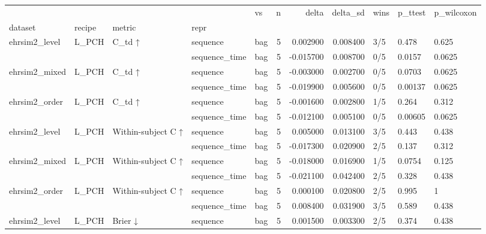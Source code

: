 \begin{tabular}{lllllrrrlll}
\toprule
 &  &  &  & vs & n & delta & delta\_sd & wins & p\_ttest & p\_wilcoxon \\
dataset & recipe & metric & repr &  &  &  &  &  &  &  \\
\midrule
\multirow[t]{2}{*}{ehrsim2\_level} & \multirow[t]{2}{*}{L\_PCH} & \multirow[t]{2}{*}{C\_td ↑} & sequence & bag & 5 & 0.002900 & 0.008400 & 3/5 & 0.478 & 0.625 \\
 &  &  & sequence\_time & bag & 5 & -0.015700 & 0.008700 & 0/5 & 0.0157 & 0.0625 \\
\cline{1-11} \cline{2-11} \cline{3-11}
\multirow[t]{2}{*}{ehrsim2\_mixed} & \multirow[t]{2}{*}{L\_PCH} & \multirow[t]{2}{*}{C\_td ↑} & sequence & bag & 5 & -0.003000 & 0.002700 & 0/5 & 0.0703 & 0.0625 \\
 &  &  & sequence\_time & bag & 5 & -0.019900 & 0.005600 & 0/5 & 0.00137 & 0.0625 \\
\cline{1-11} \cline{2-11} \cline{3-11}
\multirow[t]{2}{*}{ehrsim2\_order} & \multirow[t]{2}{*}{L\_PCH} & \multirow[t]{2}{*}{C\_td ↑} & sequence & bag & 5 & -0.001600 & 0.002800 & 1/5 & 0.264 & 0.312 \\
 &  &  & sequence\_time & bag & 5 & -0.012100 & 0.005100 & 0/5 & 0.00605 & 0.0625 \\
\cline{1-11} \cline{2-11} \cline{3-11}
\multirow[t]{2}{*}{ehrsim2\_level} & \multirow[t]{2}{*}{L\_PCH} & \multirow[t]{2}{*}{Within-subject C ↑} & sequence & bag & 5 & 0.005000 & 0.013100 & 3/5 & 0.443 & 0.438 \\
 &  &  & sequence\_time & bag & 5 & -0.017300 & 0.020900 & 2/5 & 0.137 & 0.312 \\
\cline{1-11} \cline{2-11} \cline{3-11}
\multirow[t]{2}{*}{ehrsim2\_mixed} & \multirow[t]{2}{*}{L\_PCH} & \multirow[t]{2}{*}{Within-subject C ↑} & sequence & bag & 5 & -0.018000 & 0.016900 & 1/5 & 0.0754 & 0.125 \\
 &  &  & sequence\_time & bag & 5 & -0.021100 & 0.042400 & 2/5 & 0.328 & 0.438 \\
\cline{1-11} \cline{2-11} \cline{3-11}
\multirow[t]{2}{*}{ehrsim2\_order} & \multirow[t]{2}{*}{L\_PCH} & \multirow[t]{2}{*}{Within-subject C ↑} & sequence & bag & 5 & 0.000100 & 0.020800 & 2/5 & 0.995 & 1 \\
 &  &  & sequence\_time & bag & 5 & 0.008400 & 0.031900 & 3/5 & 0.589 & 0.438 \\
\cline{1-11} \cline{2-11} \cline{3-11}
\multirow[t]{2}{*}{ehrsim2\_level} & \multirow[t]{2}{*}{L\_PCH} & \multirow[t]{2}{*}{Brier ↓} & sequence & bag & 5 & 0.001500 & 0.003300 & 2/5 & 0.374 & 0.438 \\

\end{tabular}
